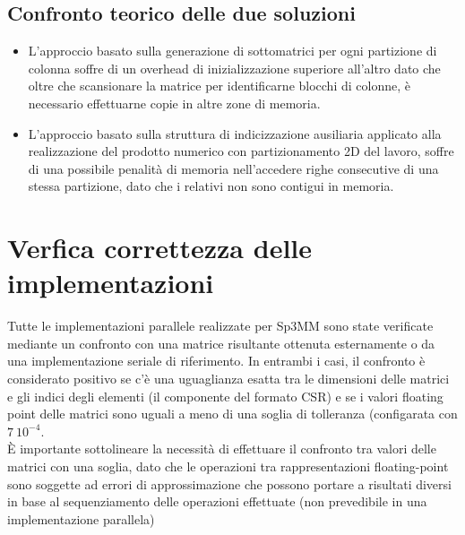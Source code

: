 \subsection{Confronto teorico delle due soluzioni}
\begin{itemize}
	\item
	L'approccio basato sulla generazione di sottomatrici per ogni partizione di colonna 
	soffre di un overhead di inizializzazione superiore all'altro dato che 
	oltre che scansionare la matrice per identificarne blocchi di colonne, è necessario effettuarne
	copie in altre zone di memoria.\\
	\item 
	L'approccio basato sulla struttura di indicizzazione ausiliaria applicato alla realizzazione
	del prodotto numerico con partizionamento 2D del lavoro, soffre di una possibile penalità di memoria
	nell'accedere righe consecutive di una stessa partizione, dato che i \nnz relativi non sono 
	contigui in memoria.
\end{itemize}

\section{Verfica correttezza delle implementazioni}
Tutte le implementazioni parallele realizzate per Sp3MM sono state verificate 
mediante un confronto con una matrice risultante ottenuta esternamente o
da una implementazione seriale di riferimento.
In entrambi i casi, il confronto è considerato positivo se c'è una uguaglianza esatta 
tra le dimensioni delle matrici e gli indici degli elementi \nnz (il componente  del formato CSR)
e se i valori floating point delle matrici sono uguali a meno di una soglia di tolleranza (configarata con $7~10^{-4}$.\\
È importante sottolineare la necessità di effettuare il confronto tra valori \nnz delle matrici con una soglia,
dato che le operazioni tra rappresentazioni floating-point sono soggette ad errori di approssimazione che possono portare 
a risultati diversi in base al sequenziamento delle operazioni effettuate (non prevedibile in una implementazione parallela)
\cite{goldmanFP}

